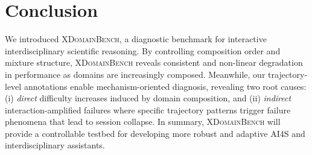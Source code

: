 \section{Conclusion}
\label{sec:conclusion}
We introduced \textsc{XDomainBench}, a diagnostic benchmark for interactive interdisciplinary scientific reasoning.
By controlling composition order and mixture structure, \textsc{XDomainBench} reveals consistent and non-linear degradation in performance as domains are increasingly composed.
Meanwhile, our trajectory-level annotations enable mechanism-oriented diagnosis, revealing two root causes: (i) \emph{direct} difficulty increases induced by domain composition, and (ii) \emph{indirect} interaction-amplified failures where specific trajectory patterns trigger failure phenomena that lead to session collapse.
In summary, \textsc{XDomainBench} will provide a controllable testbed for developing more robust and adaptive AI4S and interdisciplinary assistants.